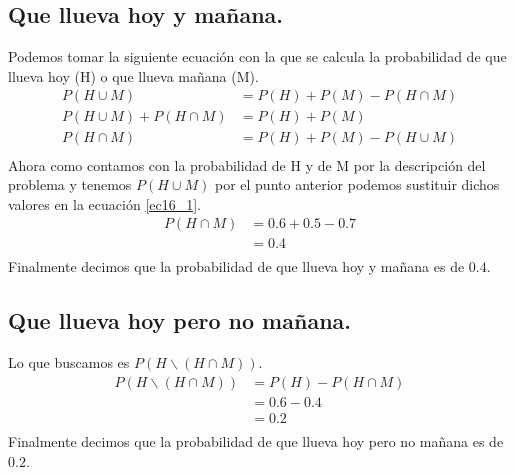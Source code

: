 \documentclass[12pt]{article}
\begin{document}
\subsection{Que llueva hoy y mañana.}
Podemos tomar la siguiente ecuación con la que se calcula la probabilidad de que llueva hoy (H) o que llueva mañana (M).\\
\begin{equation}\label{ec16_1}
	\begin{split}
		P(H\cup M) &= P(H) + P(M) - P(H\cap M)\\
		P(H\cup M) + P(H\cap M) &= P(H) + P(M)\\
		P(H\cap M) &= P(H) + P(M) - P(H\cup M)\\
	\end{split}
\end{equation}
Ahora como contamos con la probabilidad de H y de M por la descripción del problema y tenemos $P(H\cup M)$ por el punto anterior podemos sustituir dichos valores en la ecuación \ref{ec16_1}.
\begin{equation}\label{ec16_2}
\begin{split}
P(H\cap M) &= 0.6 + 0.5 - 0.7\\
&= 0.4\\
\end{split}
\end{equation}
Finalmente decimos que la probabilidad de que llueva hoy y mañana es de $0.4$.
\subsection{Que llueva hoy pero no mañana.}
Lo que buscamos es $P(H\backslash (H\cap M))$.
\begin{equation}\label{ec16_3}
\begin{split}
P(H\backslash (H\cap M)) &= P(H) - P(H\cap M)\\
&= 0.6 - 0.4\\
&= 0.2\\
\end{split}
\end{equation}
Finalmente decimos que la probabilidad de que llueva hoy pero no mañana es de $0.2$.
\end{document}
